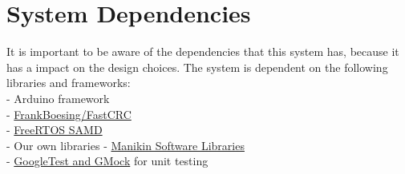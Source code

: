 \section {System Dependencies}
It is important to be aware of the dependencies that this system has, because it has a impact on the design choices. 
The system is dependent on the following libraries and frameworks: \\
- Arduino framework \\
- \href{https://github.com/FrankBoesing/FastCRC}{FrankBoesing/FastCRC} \\
- \href{https://github.com/BriscoeTech/Arduino-FreeRTOS-SAMD21}{FreeRTOS SAMD} \\
- Our own libraries - \href{https://github.com/RobotPatient/Manikin_Software_Libraries}{Manikin Software Libraries} \\
- \href{https://github.com/google/googletest}{GoogleTest and GMock} for unit testing \\
